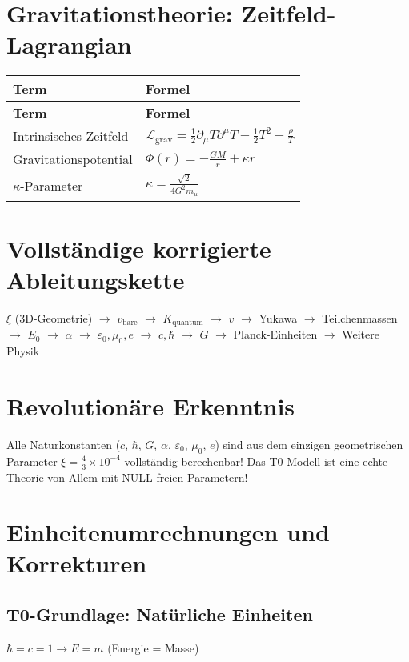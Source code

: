\documentclass[12pt,a4paper]{article}
\begin{document}
	\section{Gravitationstheorie: Zeitfeld-Lagrangian}
	\begin{longtable}{|p{5cm}|p{6cm}|}
		\hline
		\textbf{Term} & \textbf{Formel} \\
		\hline
		\endfirsthead
		\hline
		\textbf{Term} & \textbf{Formel} \\
		\hline
		\endhead
		Intrinsisches Zeitfeld & $\mathcal{L}_{\text{grav}} = \frac{1}{2}\partial_{\mu}T\partial^{\mu}T - \frac{1}{2}T^{2} - \frac{\rho}{T}$ \\
		\hline
		Gravitationspotential & $\Phi(r) = -\frac{GM}{r} + \kappa r$ \\
		\hline
		$\kappa$-Parameter & $\kappa = \frac{\sqrt{2}}{4G^{2}m_{\mu}}$ \\
		\hline
	\end{longtable}
	
	\section{Vollständige korrigierte Ableitungskette}
	\begin{center}
		\parbox{10cm}{\centering $\xi$ (3D-Geometrie) $\rightarrow$ $v_{\text{bare}}$ $\rightarrow$ $K_{\text{quantum}}$ $\rightarrow$ $v$ $\rightarrow$ Yukawa $\rightarrow$ Teilchenmassen $\rightarrow$ $E_0$ $\rightarrow$ $\alpha$ $\rightarrow$ $\varepsilon_0, \mu_0, e$ $\rightarrow$ $c, \hbar$ $\rightarrow$ $G$ $\rightarrow$ Planck-Einheiten $\rightarrow$ Weitere Physik}
	\end{center}
	
	\section{Revolutionäre Erkenntnis}
	Alle Naturkonstanten ($c$, $\hbar$, $G$, $\alpha$, $\varepsilon_0$, $\mu_0$, $e$) sind aus dem einzigen geometrischen Parameter $\xi = \frac{4}{3} \times 10^{-4}$ vollständig berechenbar! Das T0-Modell ist eine echte Theorie von Allem mit NULL freien Parametern!
	
	\section{Einheitenumrechnungen und Korrekturen}
	\subsection{T0-Grundlage: Natürliche Einheiten}
	\begin{center}
		$\hbar = c = 1 \rightarrow E = m$ (Energie = Masse)
	\end{center}
	
\end{document}
